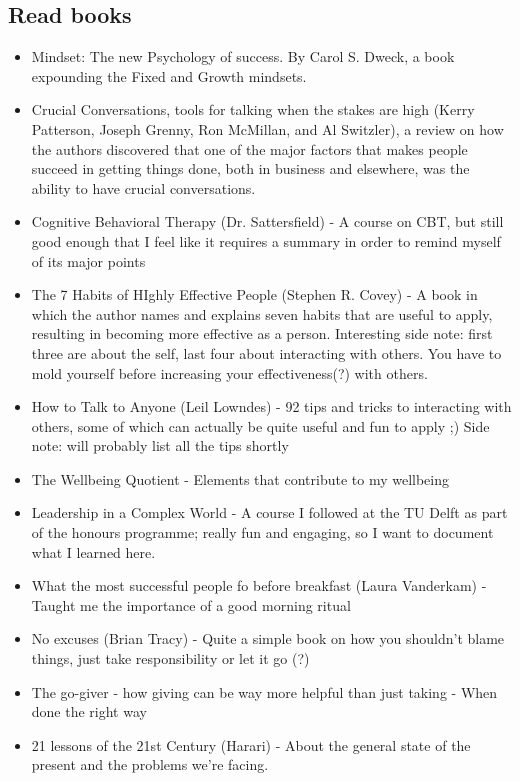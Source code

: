 \documentclass[12pt,a4paper]{article} %
\begin{document}
\subsection{Read books}

\begin{itemize}
\item Mindset: The new Psychology of success. By Carol S. Dweck, a book expounding the Fixed and Growth mindsets.

\item Crucial Conversations, tools for talking when the stakes are high (Kerry Patterson, Joseph Grenny, Ron McMillan, and Al Switzler), a review on how the authors discovered that one of the major factors that makes people succeed in getting things done, both in business and elsewhere, was the ability to have crucial conversations.
\item Cognitive Behavioral Therapy (Dr. Sattersfield) -  A course on CBT, but still good enough that I feel like it requires a summary in order to remind myself of its major points
\item The 7 Habits of HIghly Effective People (Stephen R. Covey) - A book in which the author names and explains seven habits that are useful to apply, resulting in becoming more effective as a person. Interesting side note: first three are about the self, last four about interacting with others. You have to mold yourself before increasing your effectiveness(?) with others.
\item How to Talk to Anyone (Leil Lowndes) - 92 tips and tricks to interacting with others, some of which can actually be quite useful and fun to apply ;) Side note: will probably list all the tips shortly
\item The Wellbeing Quotient - Elements that contribute to my wellbeing
\item Leadership in a Complex World - A course I followed at the TU Delft as part of the honours programme; really fun and engaging, so I want to document what I learned here.
\item What the most successful people fo before breakfast (Laura Vanderkam) - Taught me the importance of a good morning ritual
\item No excuses  (Brian Tracy) - Quite a simple book on how you shouldn't blame things, just take responsibility or let it go (?)
\item The go-giver - how giving can be way more helpful than just taking - When done the right way
\item 21 lessons of the 21st Century (Harari) - About the general state of the present and the problems we're facing.

\end{itemize}
\end{document}
